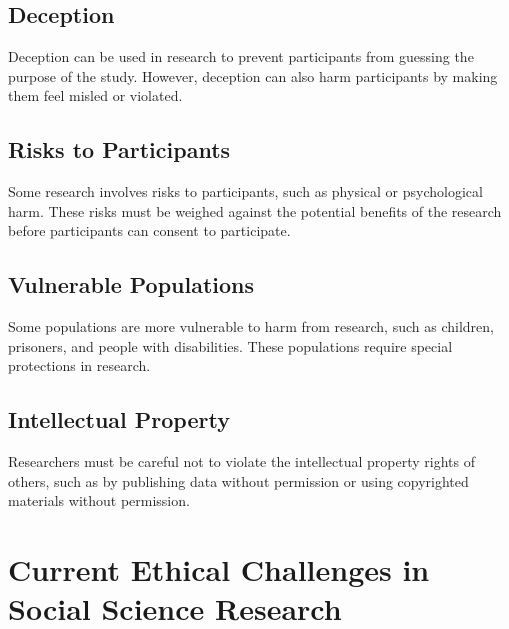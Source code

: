 \documentclass[
  b5paper]{book}
\begin{document}
\hypertarget{deception}{%
\subsection*{Deception}\label{deception}}

Deception can be used in research to prevent participants from guessing the purpose of the study. However, deception can also harm participants by making them feel misled or violated.

\hypertarget{risks-to-participants}{%
\subsection*{Risks to Participants}\label{risks-to-participants}}

Some research involves risks to participants, such as physical or psychological harm. These risks must be weighed against the potential benefits of the research before participants can consent to participate.

\hypertarget{vulnerable-populations}{%
\subsection*{Vulnerable Populations}\label{vulnerable-populations}}

Some populations are more vulnerable to harm from research, such as children, prisoners, and people with disabilities. These populations require special protections in research.

\hypertarget{intellectual-property}{%
\subsection*{Intellectual Property}\label{intellectual-property}}

Researchers must be careful not to violate the intellectual property rights of others, such as by publishing data without permission or using copyrighted materials without permission.

\hypertarget{current-ethical-challenges-in-social-science-research}{%
\section{Current Ethical Challenges in Social Science Research}\label{current-ethical-challenges-in-social-science-research}}
\end{document}
